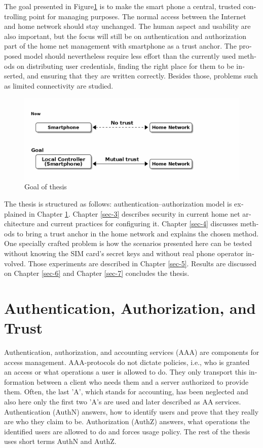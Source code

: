 \documentclass[12pt,a4paper,english]{tutthesis}
\begin{document}
\begin{otherlanguage}{english}
The goal presented in Figure\ref{fig:intro-goal} is to make the smart phone a central, trusted controlling 
point for managing purposes. The normal access between the
Internet and home network should stay unchanged. 
The human aspect and usability are also important, but the focus will
still be on authentication and authorization part of the home net
management with smartphone as a trust anchor.  The proposed model
should nevertheless require less effort than the currently used methods
on distributing user credentials, finding the right place for them to be
inserted, and ensuring that they are written correctly.
Besides those, problems such as limited connectivity are
studied.
\begin{figure}[htb]
\centering
\includegraphics[width=.9\linewidth]{intro-goal.png}
\caption{\label{fig:intro-goal}Goal of thesis}
\end{figure}





The thesis is structured as follows: authentication--authorization
model is explained in Chapter \ref{sec-2}.  Chapter \ref{sec-3}
describes security in current home net architecture and current
practices for configuring it.  Chapter \ref{sec-4} discusses methods
to bring a trust anchor in the home network and explains the chosen
method.
One specially crafted problem is how the scenarios presented here can be
tested without knowing the SIM card's secret keys and without real phone
operator involved.  Those experiments are described in Chapter \ref{sec-5}.
Results are discussed on Chapter \ref{sec-6} and Chapter \ref{sec-7} concludes the
thesis.
\chapter{Authentication, Authorization, and Trust}
\label{sec-2}



Authentication, authorization, and accounting services (AAA) are
components for access management.  AAA-protocols do not dictate
policies, i.e., who is granted an access or what operations a user is
allowed to do. They only transport this information between a client
who needs them and a server authorized to provide them.
Often, the last 'A', which stands for accounting, has been neglected
and also here only the first two 'A's are used and later described as AA
services. Authentication (AuthN) answers, how to identify users and
prove that they really are who they claim to be. Authorization (AuthZ)
answers, what operations the identified users are allowed to do and
forces usage policy. The rest of the thesis uses short terms AuthN
and AuthZ.


\end{otherlanguage}
\end{document}
